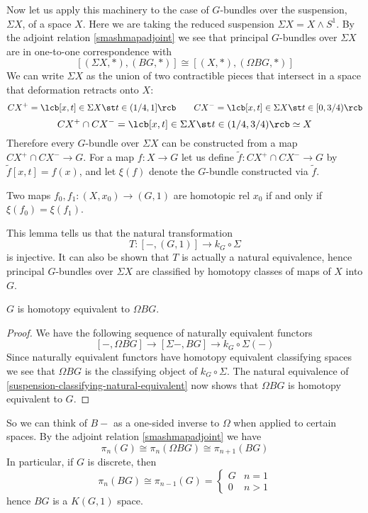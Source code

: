 Now let us apply this machinery to the case of $G$-bundles over the suspension, $\Sigma X$, of a space $X$. Here we are taking the reduced suspension $\Sigma X = X \wedge S^1$. By the adjoint relation \eqref{smashmapadjoint} we see that principal $G$-bundles over $\Sigma X$ are in one-to-one correspondence with
\[ [(\Sigma X,*),(BG,*)] \cong [(X,*),(\Omega BG,*)] \]
We can write $\Sigma X$ as the union of two contractible pieces that intersect in a space that deformation retracts onto $X$:
\[ CX^+ = \lcb [x,t] \in \Sigma X \st t \in (1/4,1] \rcb \ \ \ \ \ \ CX^- = \lcb [x,t] \in \Sigma X \st t \in [0,3/4) \rcb \]
\[ CX^+ \cap CX^- = \lcb [x,t] \in \Sigma X \st t \in (1/4,3/4) \rcb \simeq X \]
Therefore every $G$-bundle over $\Sigma X$ can be constructed from a map $CX^+ \cap CX^- \rightarrow G$. For a map $f : X \rightarrow G$ let us define $\widetilde{f} : CX^+ \cap CX^- \rightarrow G$ by $\widetilde{f}[x,t] = f(x)$, and let $\xi(f)$ denote the $G$-bundle constructed via $\widetilde{f}$.
\begin{lem}
Two maps $f_0,f_1 : (X,x_0) \rightarrow (G,1)$ are homotopic rel $x_0$ if and only if $\xi(f_0) = \xi(f_1)$.
\end{lem}
This lemma tells us that the natural transformation
\begin{equation}
\label{suspension-classifying-natural-equivalent}
T : [-,(G,1)] \rightarrow k_G \circ \Sigma
\end{equation}
is injective. It can also be shown that $T$ is actually a natural equivalence, hence principal $G$-bundles over $\Sigma X$ are classified by homotopy classes of maps of $X$ into $G$.
\begin{cor}
$G$ is homotopy equivalent to $\Omega BG$.
\end{cor}
\begin{proof}
We have the following sequence of naturally equivalent functors
\[ [-,\Omega BG] \longrightarrow [\Sigma-,BG] \longrightarrow k_G \circ \Sigma(-) \]
Since naturally equivalent functors have homotopy equivalent classifying spaces we see that $\Omega BG$ is the classifying object of $k_G \circ \Sigma$. The natural equivalence of \eqref{suspension-classifying-natural-equivalent} now shows that $\Omega BG$ is homotopy equivalent to $G$.
\end{proof}
So we can think of $B-$ as a one-sided inverse to $\Omega$ when applied to certain spaces. By the adjoint relation \eqref{smashmapadjoint} we have
\[ \pi_n(G) \cong \pi_n(\Omega BG) \cong \pi_{n+1}(BG) \]
In particular, if $G$ is discrete, then
\[ \pi_n(BG) \cong \pi_{n-1}(G) = \begin{cases} G & n=1 \\ 0 & n>1 \end{cases} \]
hence $BG$ is a $K(G,1)$ space.

